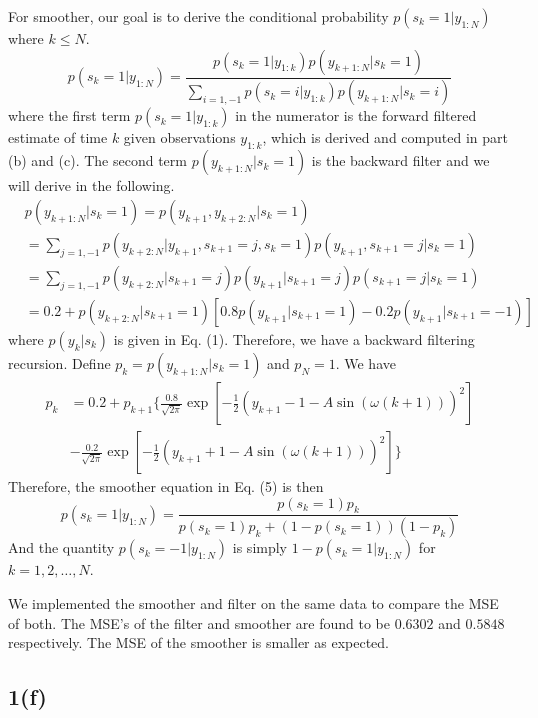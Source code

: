 \documentclass[a4paper, 11pt]{article}
\begin{document}
For smoother, our goal is to derive the conditional probability $p(s_k=1|y_{1:N})$ where $k \leq N$. 
\begin{equation}
p(s_k=1|y_{1:N}) = \frac{p(s_k=1|y_{1:k})p(y_{k+1:N}|s_k=1)}{\sum_{i=1,-1}p(s_k=i|y_{1:k})p(y_{k+1:N}|s_k=i)}
\end{equation}
where the first term $p(s_k=1|y_{1:k})$ in the numerator is the forward filtered estimate of time $k$ given observations $y_{1:k}$, which is derived and computed in part (b) and (c). The second term $p(y_{k+1:N}|s_k=1)$ is the backward filter and we will derive in the following. 
\begin{equation}
\begin{split}
 & p(y_{k+1:N}|s_k=1) = p(y_{k+1}, y_{k+2:N}|s_k = 1)\\
 & = \sum_{j=1,-1} p(y_{k+2:N}|y_{k+1}, s_{k+1}=j, s_k=1)p(y_{k+1}, s_{k+1}=j|s_k=1)\\
 & = \sum_{j=1,-1} p(y_{k+2:N}|s_{k+1}=j)p(y_{k+1}|s_{k+1}=j)p(s_{k+1}=j|s_k=1)\\
 & = 0.2 + p(y_{k+2:N}|s_{k+1}=1)\left[0.8p(y_{k+1}|s_{k+1}=1)-0.2p(y_{k+1}|s_{k+1}=-1) \right]
\end{split}
\end{equation}
where $p(y_k|s_k)$ is given in Eq. (1). Therefore, we have a backward filtering recursion. Define $p_k = p(y_{k+1:N}|s_k=1)$ and $p_N = 1$. We have 
\begin{equation}
\begin{split}
p_k & = 0.2 + p_{k+1}\Bigg\{\frac{0.8}{\sqrt{2\pi}}\exp\left[-\frac{1}{2}\left(y_{k+1} - 1 - A\sin(\omega (k+1)) \right)^2 \right] \\
 & - \frac{0.2}{\sqrt{2\pi}}\exp\left[-\frac{1}{2}\left(y_{k+1} + 1 - A\sin(\omega (k+1)) \right)^2 \right]  \Bigg\}
\end{split}
\end{equation}
Therefore, the smoother equation in Eq. (5) is then 
\begin{equation}
p(s_k=1|y_{1:N}) = \frac{p(s_k=1)p_k}{p(s_k=1)p_k + (1-p(s_k=1))(1-p_k)}
\end{equation}
And the quantity $p(s_k=-1|y_{1:N})$ is simply $1-p(s_k=1|y_{1:N})$ for $k = 1,2,\dots, N$.

We implemented the smoother and filter on the same data to compare the MSE of both. The MSE's of the filter and smoother are found to be $0.6302$ and $0.5848$ respectively. The MSE of the smoother is smaller as expected. 



\subsection*{1(f)}
\end{document}
